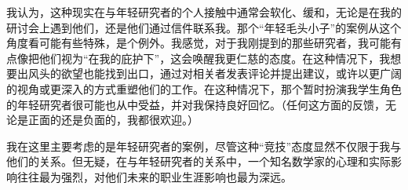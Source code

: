 我认为，这种现实在与年轻研究者的个人接触中通常会软化、缓和，无论是在我的研讨会上遇到他们，还是他们通过信件联系我。那个``年轻毛头小子''的案例从这个角度看可能有些特殊，是个例外。我感觉，对于我刚提到的那些研究者，我可能有点像把他们视为``在我的庇护下''，这会唤醒我更仁慈的态度。在这种情况下，我想要出风头的欲望也能找到出口，通过对相关者发表评论并提出建议，或许以更广阔的视角或更深入的方式重塑他们的工作。在这种情况下，那个暂时扮演我学生角色的年轻研究者很可能也从中受益，并对我保持良好回忆。（任何这方面的反馈，无论是正面的还是负面的，我都很欢迎。）

我在这里主要考虑的是年轻研究者的案例，尽管这种``竞技''态度显然不仅限于我与他们的关系。但无疑，在与年轻研究者的关系中，一个知名数学家的心理和实际影响往往最为强烈，对他们未来的职业生涯影响也最为深远。